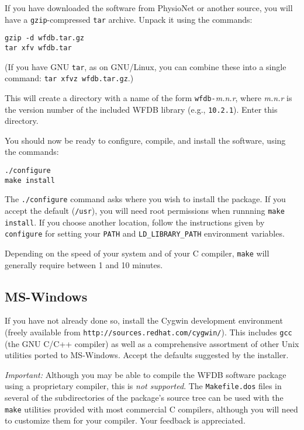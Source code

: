 \documentclass[twoside]{article}
\begin{document}
If you have downloaded the software from PhysioNet or another source, you
will have a {\tt gzip}-compressed {\tt tar} archive.  Unpack it using
the commands:

\begin{verbatim}
gzip -d wfdb.tar.gz
tar xfv wfdb.tar
\end{verbatim}

(If you have GNU {\tt tar}, as on GNU/Linux, you can combine these into a
single command: {\tt tar xfvz wfdb.tar.gz}.)

This will create a directory with a name of the form {\tt wfdb-}{\em m.n.r},
where {\em m.n.r} is the version number of the included WFDB library (e.g.,
{\tt 10.2.1}).  Enter this directory.

You should now be ready to configure, compile, and install the software, using
the commands:

\begin{verbatim}
./configure
make install
\end{verbatim}

The {\tt ./configure} command asks where you wish to install the package.
If you accept the default ({\tt /usr}), you will need root permissions when
runnning {\tt make install}.  If you choose another location, follow the
instructions given by {\tt configure} for setting your {\tt PATH} and
{\tt LD\_LIBRARY\_PATH} environment variables.

Depending on the speed of your system and of your C compiler, {\tt make} will
generally require between 1 and 10 minutes.

\subsection*{MS-Windows}

If you have not already done so, install the Cygwin development environment
(freely available from {\tt http://\-sources.\-red\-hat.\-com/\-cygwin/}).  This includes
{\tt gcc} (the GNU C/C++ compiler) as well as a comprehensive assortment of
other Unix utilities ported to MS-Windows.  Accept the defaults suggested by
the installer.

\emph{Important:} Although you may be able to compile the WFDB software
package using a proprietary compiler, this is \emph{not supported}.  The
{\tt Makefile.dos} files in several of the subdirectories of the package's
source tree can be used with the {\tt make} utilities provided with most
commercial C compilers, although you will need to customize them for your
compiler. Your feedback is appreciated.
\end{document}
